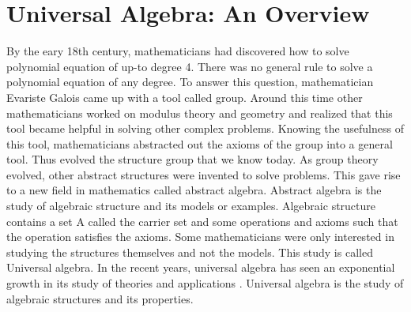 \chapter{Universal Algebra: An Overview}

By the eary 18th century, mathematicians had discovered how to solve polynomial equation of up-to degree 4. There was no general rule to solve a polynomial equation of any degree. To answer this question, mathematician Evariste Galois came up with a tool called group. Around this time other mathematicians worked on modulus theory and geometry and realized that this tool became helpful in solving other complex problems. \cite{enwiki:1107380309} Knowing the usefulness of this tool, mathematicians abstracted out the axioms of the group into a general tool. Thus evolved the structure group that we know today. As group theory evolved, other abstract structures were invented to solve problems. This gave rise to a new field in mathematics called abstract algebra. Abstract algebra is the study of algebraic structure and its models or examples.  Algebraic structure contains a set A called the carrier set and some operations and axioms such that the operation satisfies the axioms. Some mathematicians were only interested in studying the structures themselves and not the models. This study is called Universal algebra.  In the recent years, universal algebra has seen an exponential growth in its study of theories and applications \cite{sankappanavar1981course}. Universal algebra is the study of algebraic structures and its properties. 

